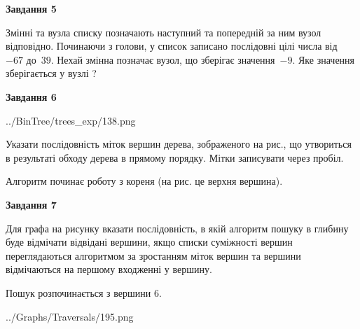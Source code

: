 \documentclass[12pt, ukrainian]{article}
\begin{document}
{\begin {large}
{\begin {center}\textbf{Завдання 5}\end {center}}\par
Змінні  та  вузла списку позначають наступний та попередній за ним вузол відповідно. Починаючи з голови, у список записано послідовні цілі числа від~$-67$ до~$39$. Нехай змінна  позначає вузол, що зберігає значення~$-9$.
Яке значення зберігається у вузлі  ?\par
\newpage

{\begin {center}\textbf{Завдання 6}\end {center}}\par

\begin{center}
	{../BinTree/trees_exp/138.png}
\end{center}
Указати послідовність міток вершин дерева, зображеного на рис., що утвориться в результаті обходу дерева в прямому порядку. Мітки записувати через пробіл.\par Алгоритм починає роботу з кореня (на рис. це верхня вершина).\par
\newpage

{\begin {center}\textbf{Завдання 7}\end {center}}\par
Для графа на рисунку вказати послідовність, в якій алгоритм пошуку в глибину буде відмічати відвідані вершини, якщо списки суміжності вершин переглядаються алгоритмом за зростанням міток вершин та вершини відмічаються на першому вход\-женні у вершину.\par
Пошук розпочинається з вершини 6.\par

\begin{center}
	{../Graphs/Traversals/195.png}
\end{center}\par
\newpage


\end{large}}
\end{document}
